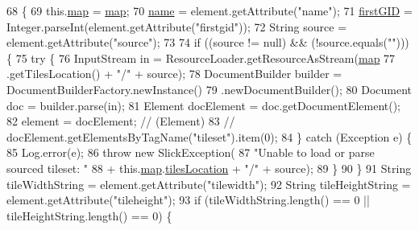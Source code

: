 \begin{DoxyCode}
68                                   \{
69         this.\mbox{\hyperlink{classorg_1_1newdawn_1_1slick_1_1tiled_1_1_tile_set_a6d8213553283cc2970748811ec170644}{map}} = \mbox{\hyperlink{classorg_1_1newdawn_1_1slick_1_1tiled_1_1_tile_set_a6d8213553283cc2970748811ec170644}{map}};
70         \mbox{\hyperlink{classorg_1_1newdawn_1_1slick_1_1tiled_1_1_tile_set_ac0de29bb9eb37a2c57db969aab877e49}{name}} = element.getAttribute(\textcolor{stringliteral}{"name"});
71         \mbox{\hyperlink{classorg_1_1newdawn_1_1slick_1_1tiled_1_1_tile_set_a7c27767efccd6a3a68dfa519251fbec1}{firstGID}} = Integer.parseInt(element.getAttribute(\textcolor{stringliteral}{"firstgid"}));
72         String source = element.getAttribute(\textcolor{stringliteral}{"source"});
73 
74         \textcolor{keywordflow}{if} ((source != null) && (!source.equals(\textcolor{stringliteral}{""}))) \{
75             \textcolor{keywordflow}{try} \{
76                 InputStream in = ResourceLoader.getResourceAsStream(\mbox{\hyperlink{classorg_1_1newdawn_1_1slick_1_1tiled_1_1_tile_set_a6d8213553283cc2970748811ec170644}{map}}
77                         .getTilesLocation() + \textcolor{stringliteral}{"/"} + source);
78                 DocumentBuilder builder = DocumentBuilderFactory.newInstance()
79                         .newDocumentBuilder();
80                 Document doc = builder.parse(in);
81                 Element docElement = doc.getDocumentElement();
82                 element = docElement; \textcolor{comment}{// (Element)}
83                                         \textcolor{comment}{// docElement.getElementsByTagName("tileset").item(0);}
84             \} \textcolor{keywordflow}{catch} (Exception e) \{
85                 Log.error(e);
86                 \textcolor{keywordflow}{throw} \textcolor{keyword}{new} SlickException(
87                         \textcolor{stringliteral}{"Unable to load or parse sourced tileset: "}
88                                 + this.\mbox{\hyperlink{classorg_1_1newdawn_1_1slick_1_1tiled_1_1_tile_set_a6d8213553283cc2970748811ec170644}{map}}.\mbox{\hyperlink{classorg_1_1newdawn_1_1slick_1_1tiled_1_1_tiled_map_ad72e470aa9510074aae12dab7968ec1f}{tilesLocation}} + \textcolor{stringliteral}{"/"} + source);
89             \}
90         \}
91         String tileWidthString = element.getAttribute(\textcolor{stringliteral}{"tilewidth"});
92         String tileHeightString = element.getAttribute(\textcolor{stringliteral}{"tileheight"});
93         \textcolor{keywordflow}{if} (tileWidthString.length() == 0 || tileHeightString.length() == 0) \{

\end{DoxyCode}
